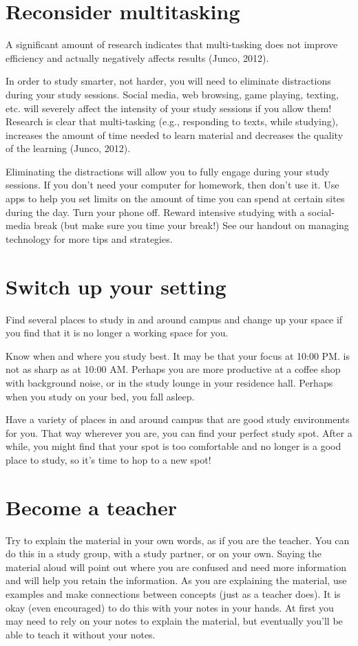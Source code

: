 \documentclass[../main.tex]{subfiles}
\begin{document}
\section{Reconsider multitasking}
A significant amount of research indicates that multi-tasking does not improve
efficiency and actually negatively affects results (Junco, 2012).

In order to study smarter, not harder, you will need to eliminate distractions
during your study sessions. Social media, web browsing, game playing, texting,
etc. will severely affect the intensity of your study sessions if you allow
them! Research is clear that multi-tasking (e.g., responding to texts, while
studying), increases the amount of time needed to learn material and decreases
the quality of the learning (Junco, 2012).

Eliminating the distractions will allow you to fully engage during your study
sessions. If you don't need your computer for homework, then don't use it. Use
apps to help you set limits on the amount of time you can spend at certain sites
during the day. Turn your phone off. Reward intensive studying with a
social-media break (but make sure you time your break!) See our handout on
managing technology for more tips and strategies.
%
\section{Switch up your setting}
Find several places to study in and around campus and change up your space if
you find that it is no longer a working space for you.

Know when and where you study best. It may be that your focus at 10:00 PM. is
not as sharp as at 10:00 AM. Perhaps you are more productive at a coffee shop
with background noise, or in the study lounge in your residence hall. Perhaps
when you study on your bed, you fall asleep.

Have a variety of places in and around campus that are good study environments
for you. That way wherever you are, you can find your perfect study spot. After
a while, you might find that your spot is too comfortable and no longer is a
good place to study, so it's time to hop to a new spot!
%
\section{Become a teacher}
Try to explain the material in your own words, as if you are the teacher. You
can do this in a study group, with a study partner, or on your own. Saying the
material aloud will point out where you are confused and need more information
and will help you retain the information. As you are explaining the material,
use examples and make connections between concepts (just as a teacher does). It
is okay (even encouraged) to do this with your notes in your hands. At first you
may need to rely on your notes to explain the material, but eventually you'll be
able to teach it without your notes.
\end{document}
